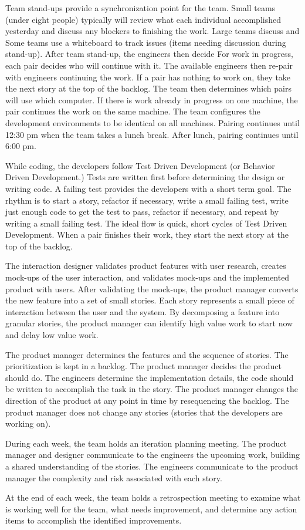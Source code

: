 Team stand-ups provide a synchronization point for the team. Small teams (under eight people) typically will review what each individual accomplished yesterday and discuss any blockers to finishing the work. Large teams discuss  and  Some teams use a whiteboard to track  issues (items needing discussion during stand-up). After team stand-up, the engineers then decide  For work in progress, each pair decides who will continue with it. The available engineers then re-pair with engineers continuing the work. If a pair has nothing to work on, they take the next story at the top of the backlog. The team then determines which pairs will use which computer. If there is work already in progress on one machine, the pair continues the work on the same machine. The team configures the development environments to be identical on all machines. Pairing continues until 12:30 pm when the team takes a lunch break. After lunch, pairing continues until 6:00 pm. 

While coding, the developers follow Test Driven Development (or Behavior Driven Development.) Tests are written first before determining the design or writing code. A failing test provides the developers with a short term goal. The rhythm is to start a story, refactor if necessary, write a small failing test, write just enough code to get the test to pass, refactor if necessary, and repeat by writing a small failing test. The ideal flow is quick, short cycles of Test Driven Development. When a pair finishes their work, they start the next story at the top of the backlog. 

The interaction designer validates product features with user research, creates mock-ups of the user interaction, and validates mock-ups and the implemented product with users. After validating the mock-ups, the product manager converts the new feature into a set of small stories. Each story represents a small piece of interaction between the user and the system. By decomposing a feature into granular stories, the product manager can identify high value work to start now and delay low value work.  

The product manager determines the features and the sequence of stories. The prioritization is kept in a backlog. The product manager decides  the product should do. The engineers determine the implementation details,  the code should be written to accomplish the task in the story. The product manager changes the direction of the product at any point in time by resequencing the backlog. The product manager does not change any  stories (stories that the developers are working on).

During each week, the team holds an iteration planning meeting. The product manager and designer communicate to the engineers the upcoming work, building a shared understanding of the stories. The engineers communicate to the product manager the complexity and risk associated with each story.

At the end of each week, the team holds a retrospection meeting to examine what is working well for the team, what needs improvement, and determine any action items to accomplish the identified improvements.

